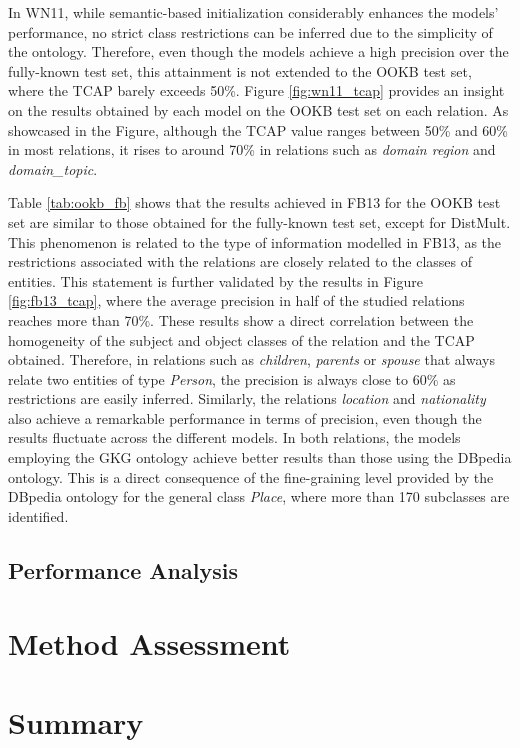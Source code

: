 In WN11, while semantic-based initialization considerably enhances the models' performance, no strict class restrictions can be inferred due to the simplicity of the ontology. Therefore, even though the models achieve a high precision over the fully-known test set, this attainment is not extended to the OOKB test set, where the TCAP barely exceeds 50\%. Figure \ref{fig:wn11_tcap} provides an insight on the results obtained by each model on the OOKB test set on each relation. As showcased in the Figure, although the TCAP value ranges between 50\% and 60\% in most relations, it rises to around 70\% in relations such as \textit{domain region} and \textit{domain_topic}.

Table \ref{tab:ookb_fb} shows that the results achieved in FB13 for the OOKB test set are similar to those obtained for the fully-known test set, except for DistMult. This phenomenon is related to the type of information modelled in FB13, as the restrictions associated with the relations are closely related to the classes of entities. This statement is further validated by the results in Figure \ref{fig:fb13_tcap}, where the average precision in half of the studied relations reaches more than 70\%. These results show a direct correlation between the homogeneity of the subject and object classes of the relation and the TCAP obtained. Therefore, in relations such as \textit{children}, \textit{parents} or \textit{spouse} that always relate two entities of type \textit{Person}, the precision is always close to 60\% as restrictions are easily inferred. Similarly, the relations \textit{location} and \textit{nationality} also achieve a remarkable performance in terms of precision, even though the results fluctuate across the different models. In both relations, the models employing the GKG ontology achieve better results than those using the DBpedia ontology. This is a direct consequence of the fine-graining level provided by the DBpedia ontology for the general class \textit{Place}, where more than 170 subclasses are identified.

\subsection{Performance Analysis}

\section{Method Assessment}




\section{Summary}
